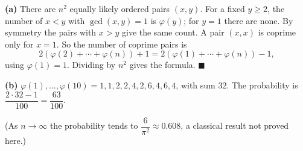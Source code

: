\textbf{(a)} There are $n^2$ equally likely ordered pairs $(x,y)$. For a fixed $y\ge2$, the number of $x<y$ with $\gcd(x,y)=1$ is $\varphi(y)$; for $y=1$ there are none. By symmetry the pairs with $x>y$ give the same count. A pair $(x,x)$ is coprime only for $x=1$. So the number of coprime pairs is
\[2\left(\varphi(2)+\cdots+\varphi(n)\right)+1=2\left(\varphi(1)+\cdots+\varphi(n)\right)-1,\]
using $\varphi(1)=1$. Dividing by $n^2$ gives the formula. $\blacksquare$

\textbf{(b)} $\varphi(1),\dots,\varphi(10)=1,1,2,2,4,2,6,4,6,4$, with sum $32$. The probability is $\dfrac{2\cdot32-1}{100}=\boxed{\dfrac{63}{100}}$.

(As $n\to\infty$ the probability tends to $\dfrac{6}{\pi^2}\approx0.608$, a classical result not proved here.)
